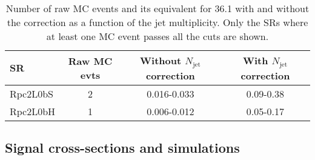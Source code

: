 \begin{table}[!htb]
\caption{Number of raw MC events and its equivalent for 36.1 \ifb with and without the correction as a function of the jet multiplicity. 
Only the SRs where at least one MC event passes all the cuts are shown.}
\label{tab:DPS_SR}
\centering
\begin{tabular}{l|c|c|c}
\hline
SR       & Raw MC evts & Without $N_{\text{jet}}$ correction & With $N_{\text{jet}}$ correction \\\hline
Rpc2L0bS & 2 & 0.016-0.033 & 0.09-0.38 \\ 
Rpc2L0bH & 1 & 0.006-0.012 & 0.05-0.17 \\ 
\hline
\end{tabular}
\end{table}




\subsection*{Signal cross-sections and simulations}

